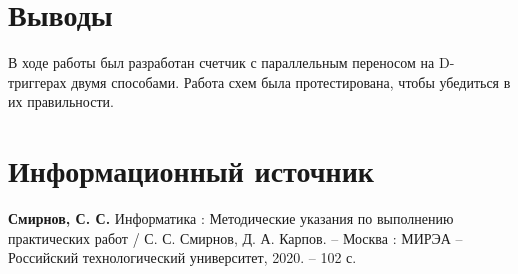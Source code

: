 \documentclass[14pt, a4paper]{extreport}
\begin{document}
\chapter{Выводы}
В ходе работы был разработан счетчик с параллельным переносом на D-триггерах двумя способами. Работа схем была протестирована, чтобы убедиться в их правильности.

\chapter{Информационный источник}
\textbf{Смирнов, С. С.} Информатика : Методические указания по выполнению практических работ / С. С. Смирнов, Д. А. Карпов. -- Москва : МИРЭА -- Российский технологический университет, 2020. -- 102 с.
\end{document}
